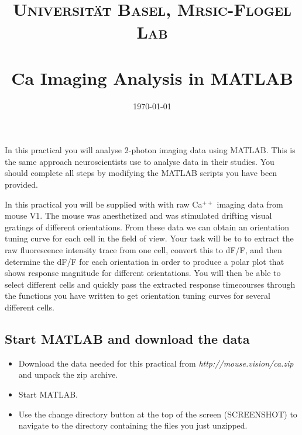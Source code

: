 \documentclass[paper=a4, fontsize=11pt]{scrartcl} %
\title{	
\normalfont \normalsize 
\textsc{Universit\"{a}t Basel, Mrsic-Flogel Lab} \\ [25pt] %
\horrule{0.5pt} \\[0.2cm] %
\huge Ca\supr{++} Imaging Analysis in MATLAB
\horrule{1.5pt}\\ %
}
\author{}
\date{\normalsize\today} %
\numberwithin{equation}{section} %
\numberwithin{figure}{section} %
\numberwithin{table}{section} %
\newcommand{\supr}[1]{\ensuremath{^{#1}}}
\begin{document}
\maketitle %

In this practical you will analyse 2-photon imaging data using MATLAB. This is the same approach 
neuroscientists use to analyse data in their studies. You should complete all steps by modifying the 
MATLAB scripts you have been provided. 

In this practical you will be supplied with with raw Ca\supr{++} imaging data from mouse V1. The mouse 
was anesthetized and was stimulated drifting visual gratings of different orientations. From these data
we can obtain an orientation tuning curve for each cell in the field of view. Your task will be to to 
extract the raw fluorescence intensity trace from one cell, convert this to dF/F, and then 
determine the dF/F for each orientation in order to produce a polar plot that shows response magnitude
for different orientations. You will then be able to select different cells and quickly pass the extracted 
response timecourses through the functions you have written to get orientation tuning curves for several 
different cells. 



\subsection{Start MATLAB and download the data}
\begin{itemize}
\item Download the data needed for this practical from \textit{http://mouse.vision/ca.zip} and unpack the zip archive. 
\item Start MATLAB.
\item Use the change directory button at the top of the screen (SCREENSHOT) to navigate to the 
directory containing the files you just unzipped. 
\end{itemize}
\end{document}
